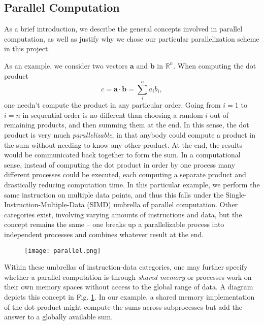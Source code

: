 \documentclass[reprint, amsmath, amssymb, aps, floatfix]{revtex4-1}
\newcommand{\bv}[1]{\mathbf{#1}}
\begin{document}
\subsection{Parallel Computation}

As a brief introduction, we describe the general concepts involved in parallel computation, as well as justify why we chose our particular parallelization scheme in this project.

As an example, we consider two vectors $\bv{a}$ and $\bv{b}$ in $\mathbb{R}^n$. When computing the dot product $$c = \bv{a}\cdot\bv{b}=\sum_i^n a_ib_i,$$ one needn't compute the product in any particular order. Going from $i=1$ to $i=n$ in sequential order is no different than choosing a random $i$ out of remaining products, and then summing them at the end. In this sense, the dot product is very much \textit{parallelizable}, in that anybody could compute a product in the sum without needing to know any other product. At the end, the results would be communicated back together to form the sum. In a computational sense, instead of computing the dot product in order by one process many different processes could be executed, each computing a separate product and drastically reducing computation time. In this particular example, we perform the same instruction on multiple data points, and thus this falls under the Single-Instruction-Multiple-Data (SIMD) umbrella of parallel computation. Other categories exist, involving varying amounts of instructions and data, but the concept remains the same -- one breaks up a parallelizable process into independent processes and combines whatever result at the end.


\begin{figure}[H]
\texttt{[image: parallel.png]}
\label{pic}
\end{figure}

Within these umbrellas of instruction-data categories, one may further specify whether a parallel computation is through \textit{shared memory} or processes work on their own memory spaces without access to the global range of data. A diagram depicts this concept in Fig. \ref{pic}. In our example, a shared memory implementation of the dot product might compute the sums across subprocesses but add the answer to a globally available sum.
\end{document}
